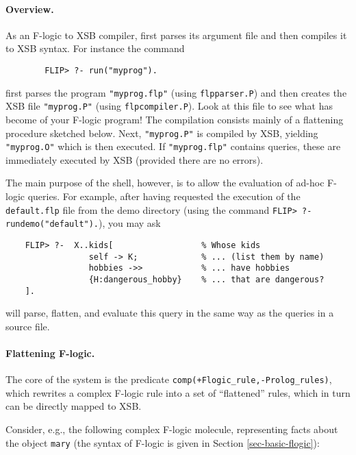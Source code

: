 \paragraph{Overview.}

As an F-logic to XSB compiler, \FLIP first parses its argument file and then
compiles it to XSB syntax. For instance the command
\begin{verbatim}
        FLIP> ?- run("myprog").  
\end{verbatim}
first parses the program \verb|"myprog.flp"| (using \texttt{flpparser.P})
and then creates the XSB file \verb|"myprog.P"| (using
\texttt{flpcompiler.P}).  Look at this file to see what has become of your
F-logic program! The compilation consists mainly of a flattening procedure
sketched below.  Next, \verb|"myprog.P"| is compiled by XSB, yielding
\verb|"myprog.O"| which is then executed.  If \verb|"myprog.flp"| contains
queries, these are immediately executed by XSB (provided there
are no errors).

The main purpose of the \FLIP shell, however, is to allow the
evaluation of ad-hoc F-logic queries. For example, after having
requested the execution of the \texttt{default.flp} file from the demo
directory (using the
command \texttt{FLIP>~?-rundemo("default").}), you may ask
\begin{verbatim}
    FLIP> ?-  X..kids[                  % Whose kids
                 self -> K;             % ... (list them by name)
                 hobbies ->>            % ... have hobbies
                 {H:dangerous_hobby}    % ... that are dangerous?
    ]. 
\end{verbatim}
\FLIP will parse, flatten, and evaluate this query in the same way as
the queries in a source file.





\paragraph{Flattening F-logic.}

The core of the \FLIP system is the predicate
\texttt{comp(+Flogic\_rule,-Prolog\_rules)}, which rewrites a complex
F-logic rule into a set of ``flattened'' rules, which in turn can be
directly mapped to XSB.

Consider, e.g., the following complex F-logic molecule, representing
facts about the object \texttt{mary} (the syntax of F-logic is given in
Section \ref{sec-basic-flogic}):


